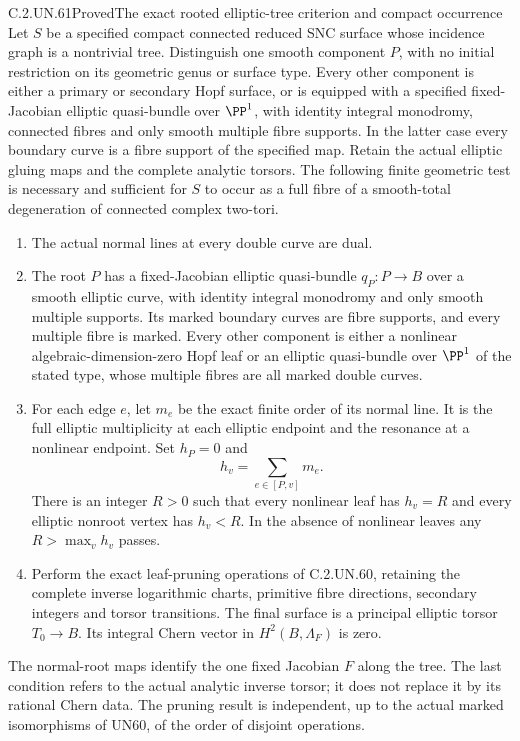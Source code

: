 \begin{statement}{C.2.UN.61}{Proved}{The exact rooted elliptic-tree criterion and compact occurrence}
Let $S$ be a specified compact connected reduced SNC surface whose
incidence graph is a nontrivial tree. Distinguish one smooth component
$P$, with no initial restriction on its geometric genus or surface
type. Every other component is either a primary or secondary Hopf
surface, or is equipped with a specified fixed-Jacobian elliptic
quasi-bundle over $\PP^1$, with identity integral monodromy,
connected fibres and only smooth multiple fibre supports.
In the latter case every boundary curve is a fibre support of
the specified map. Retain the actual elliptic gluing maps
and the complete analytic torsors. The following finite
geometric test is necessary and sufficient for $S$ to occur
as a full fibre of a smooth-total degeneration of connected complex
two-tori.

\begin{enumerate}
\item The actual normal lines at every double curve are dual.
\item The root $P$ has a fixed-Jacobian elliptic quasi-bundle
$q_P:P\to B$ over a smooth elliptic curve, with identity integral
monodromy and only smooth multiple supports. Its marked boundary
curves are fibre supports, and every multiple fibre is marked.
Every other component is either a nonlinear algebraic-dimension-zero
Hopf leaf or an elliptic quasi-bundle over $\PP^1$ of the stated
type, whose multiple fibres are all marked double curves.
\item For each edge $e$, let $m_e$ be the exact finite order of
its normal line. It is the full elliptic multiplicity at each
elliptic endpoint and the resonance at a nonlinear endpoint.
Set $h_P=0$ and
\[
                  h_v=\sum_{e\in[P,v]}m_e.
                  \tag{C.PT.1}
\]
There is an integer $R>0$ such that every nonlinear leaf has
$h_v=R$ and every elliptic nonroot vertex has $h_v<R$.
In the absence of nonlinear leaves any $R>\max_vh_v$ passes.
\item Perform the exact leaf-pruning operations of C.2.UN.60,
retaining the complete inverse logarithmic charts, primitive fibre
directions, secondary integers and torsor transitions. The final
surface is a principal elliptic torsor $T_0\to B$. Its integral
Chern vector in $H^2(B,\Lambda_F)$ is zero.
\end{enumerate}

The normal-root maps identify the one fixed Jacobian $F$ along
the tree. The last condition refers to the actual analytic
inverse torsor; it does not replace it by its rational Chern
data. The pruning result is independent, up to the actual
marked isomorphisms of UN60, of the order of disjoint operations.


\end{statement}
